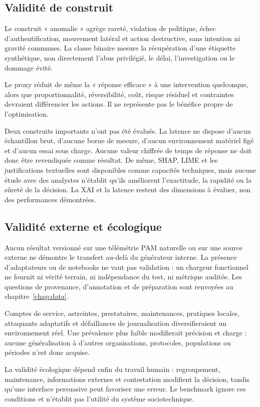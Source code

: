 \documentclass[11pt,a4paper,oneside]{report}
\theoremstyle{definition}
\theoremstyle{plain}
\begin{document}
\subsection{Validité de construit}

Le construit « anomalie » agrège rareté, violation de politique, échec
d'authentification, mouvement latéral et action destructive, sans intention ni
gravité communes. La classe binaire mesure la récupération d'une étiquette
synthétique, non directement l'abus privilégié, le délai, l'investigation ou le
dommage évité.

Le proxy réduit de même la « réponse efficace » à une intervention quelconque,
alors que proportionnalité, réversibilité, coût, risque résiduel et contraintes
devraient différencier les actions. Il ne représente pas le bénéfice propre de
l'optimisation.

Deux construits importants n'ont pas été évalués. La latence ne dispose
d'aucun échantillon brut, d'aucune borne de mesure, d'aucun environnement
matériel figé et d'aucun essai sous charge. Aucune valeur chiffrée de temps de
réponse ne doit donc être revendiquée comme résultat. De même, SHAP, LIME et
les justifications textuelles sont disponibles comme capacités techniques,
mais aucune étude avec des analystes n'établit qu'ils améliorent l'exactitude,
la rapidité ou la sûreté de la décision. La XAI et la latence restent des
dimensions à évaluer, non des performances démontrées.

\subsection{Validité externe et écologique}

Aucun résultat versionné sur une télémétrie PAM naturelle ou sur une source
externe ne démontre le transfert au-delà du générateur interne. La présence
d'adaptateurs ou de notebooks ne vaut pas validation : un chargeur fonctionnel
ne fournit ni vérité terrain, ni indépendance du test, ni métrique auditée. Les
questions de provenance, d'annotation et de préparation sont renvoyées au
chapitre~\ref{chap:data}.

Comptes de service, astreintes, prestataires, maintenances, pratiques locales,
attaquants adaptatifs et défaillances de journalisation diversifieraient un
environnement réel. Une prévalence plus faible modifierait précision et charge ;
aucune généralisation à d'autres organisations, protocoles, populations ou
périodes n'est donc acquise.

La validité écologique dépend enfin du travail humain : regroupement,
maintenance, informations externes et contestation modifient la décision,
tandis qu'une interface persuasive peut favoriser une erreur. Le benchmark
ignore ces conditions et n'établit pas l'utilité du système sociotechnique.
\end{document}
